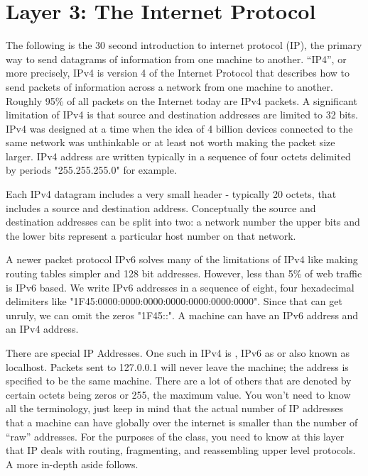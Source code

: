 \section{Layer 3: The Internet Protocol}

The following is the 30 second introduction to internet protocol (IP), the primary way to send datagrams of information from one machine to another.
``IP4'', or more precisely, \gls{IPv4} is version 4 of the Internet Protocol that describes how to send \gls{packets} of information across a network from one machine to another.
Roughly 95\% of all packets on the Internet today are IPv4 packets. 
A significant limitation of IPv4 is that source and destination addresses are limited to 32 bits.
IPv4 was designed at a time when the idea of 4 billion devices connected to the same network was unthinkable or at least not worth making the packet size larger.
\gls{IPv4 address} are written typically in a sequence of four octets delimited by periods "255.255.255.0" for example.

Each IPv4 \gls{datagram} includes a very small header - typically 20 \gls{octets}, that includes a source and destination address.
Conceptually the source and destination addresses can be split into two: a network number the upper bits and the lower bits represent a particular host number on that network.

A newer packet protocol \gls{IPv6} solves many of the limitations of IPv4 like making routing tables simpler and 128 bit addresses.
However, less than 5\% of web traffic is IPv6 based. 
We write IPv6 addresses in a sequence of eight, four hexadecimal delimiters like "1F45:0000:0000:0000:0000:0000:0000:0000".
Since that can get unruly, we can omit the zeros "1F45::". A machine can have an IPv6 address and an IPv4 address.

There are special IP Addresses.
One such in IPv4 is , IPv6 as  or  also known as localhost.
Packets sent to 127.0.0.1 will never leave the machine; the address is specified to be the same machine.
There are a lot of others that are denoted by certain octets being zeros or 255, the maximum value. You won't need to know all the terminology, just keep in mind that the actual number of IP addresses that a machine can have globally over the internet is smaller than the number of ``raw'' addresses.
For the purposes of the class, you need to know at this layer that IP deals with routing, fragmenting, and reassembling upper level protocols. A more in-depth aside follows.

